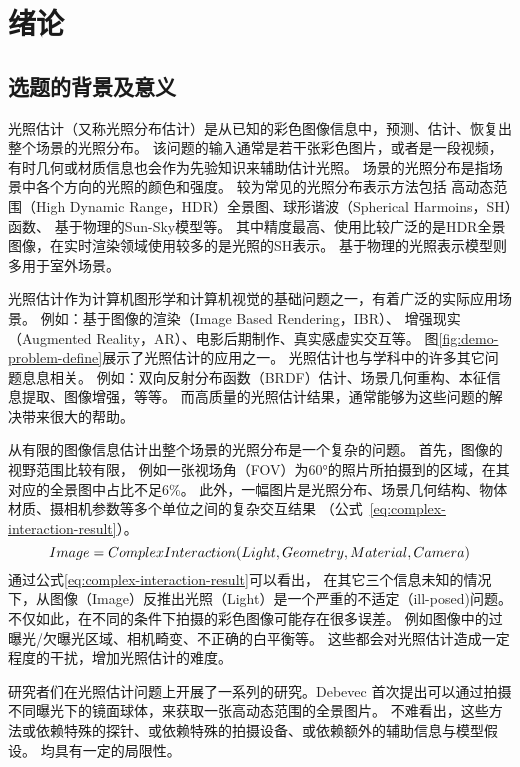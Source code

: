 \chapter{绪论}\label{chap:introduction}

\section{选题的背景及意义}

光照估计（又称光照分布估计）是从已知的彩色图像信息中，预测、估计、恢复出整个场景的光照分布。
该问题的输入通常是若干张彩色图片，或者是一段视频，有时几何或材质信息也会作为先验知识来辅助估计光照。
场景的光照分布是指场景中各个方向的光照的颜色和强度。
较为常见的光照分布表示方法包括
高动态范围（High Dynamic Range，HDR）全景图、球形谐波（Spherical Harmoins，SH）函数、
基于物理的Sun-Sky模型等。
其中精度最高、使用比较广泛的是HDR全景图像，在实时渲染领域使用较多的是光照的SH表示。 
基于物理的光照表示模型则多用于室外场景。

光照估计作为计算机图形学和计算机视觉的基础问题之一，有着广泛的实际应用场景。
例如：基于图像的渲染（Image Based Rendering，IBR）、
增强现实（Augmented Reality，AR）、电影后期制作、真实感虚实交互等。
图\ref{fig:demo-problem-define}展示了光照估计的应用之一。
光照估计也与学科中的许多其它问题息息相关。
例如：双向反射分布函数（BRDF）估计、场景几何重构、本征信息提取、图像增强，等等。
而高质量的光照估计结果，通常能够为这些问题的解决带来很大的帮助。
 

从有限的图像信息估计出整个场景的光照分布是一个复杂的问题。
首先，图像的视野范围比较有限，
例如一张视场角（FOV）为60°的照片所拍摄到的区域，在其对应的全景图中占比不足6\%。
此外，一幅图片是光照分布、场景几何结构、物体材质、摄相机参数等多个单位之间的复杂交互结果
（公式~\ref{eq:complex-interaction-result}）。
\begin{equation} \centering \label{eq:complex-interaction-result}
Image = ComplexInteraction(Light, Geometry, Material, Camera)\end{equation}
通过公式\ref{eq:complex-interaction-result}可以看出，
在其它三个信息未知的情况下，从图像（Image）反推出光照（Light）是一个严重的不适定（ill-posed)问题。
不仅如此，在不同的条件下拍摄的彩色图像可能存在很多误差。
例如图像中的过曝光/欠曝光区域、相机畸变、不正确的白平衡等。
这些都会对光照估计造成一定程度的干扰，增加光照估计的难度。

研究者们在光照估计问题上开展了一系列的研究。Debevec\cite{debevec1998rendering}
首次提出可以通过拍摄不同曝光下的镜面球体，来获取一张高动态范围的全景图片。
不难看出，这些方法或依赖特殊的探针、或依赖特殊的拍摄设备、或依赖额外的辅助信息与模型假设。
均具有一定的局限性。

